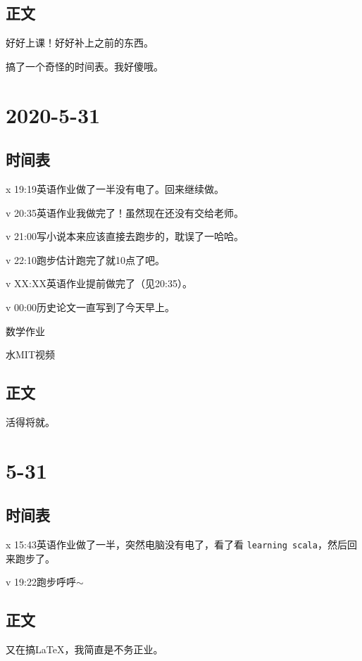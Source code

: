 \documentclass{peterlitsdoc}
\begin{document}
\subsection{正文}

好好上课！好好补上之前的东西。

搞了一个奇怪的时间表。我好傻哦。


\section{2020-5-31}

\subsection{时间表}

\begin{pltplan}
\item[x]{19:19}{英语作业}{做了一半没有电了。回来继续做。}
\item[v]{20:35}{英语作业}{我做完了！虽然现在还没有交给老师。}
\item[v]{21:00}{写小说}{本来应该直接去跑步的，耽误了一哈哈。}
\item[v]{22:10}{跑步}{估计跑完了就10点了吧。}
\item[v]{XX:XX}{英语作业}{提前做完了（见20:35）。}
\item[v]{00:00}{历史论文}{一直写到了今天早上。}
\item[ ]{}{数学作业}{}
\item[ ]{}{水MIT视频}{}
\end{pltplan}

\subsection{正文}

活得将就。


\section{5-31}

\subsection{时间表}

\begin{pltplan}
\item[x]{15:43}{英语作业}{做了一半，突然电脑没有电了，看了看
    \verb|learning scala|，然后回来跑步了。}
\item[v]{19:22}{跑步}{呼呼$\sim$}
\end{pltplan}

\subsection{正文}

又在搞\LaTeX{}，我简直是不务正业。
\end{document}
